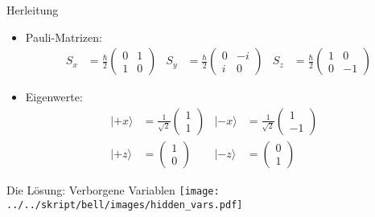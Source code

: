\documentclass{beamer}
\begin{document}
\begin{frame}{Herleitung}
    \begin{itemize}
        \item Pauli-Matrizen:
            \begin{align*}
                S_x &= \frac{\hbar}{2} \begin{pmatrix}
                0 & 1 \\ 1 & 0
                \end{pmatrix}
                &
                S_y &= \frac{\hbar}{2} \begin{pmatrix}
                0 & -i \\ i & 0
                \end{pmatrix}
                &
                S_z &= \frac{\hbar}{2} \begin{pmatrix}
                1 & 0 \\ 0 & -1
                \end{pmatrix}\label{equ:bell:paulimatrizen}
            \end{align*}
        \item Eigenwerte:
            \begin{align*}
                |{+}x\rangle &= \frac{1}{\sqrt{2}}\begin{pmatrix} 1\\1 \end{pmatrix} &
                |{-}x\rangle &= \frac{1}{\sqrt{2}}\begin{pmatrix} 1\\-1 \end{pmatrix} \\
                |{+}z\rangle &= \begin{pmatrix} 1\\0 \end{pmatrix} &
                |{-}z\rangle &= \begin{pmatrix} 0\\1 \end{pmatrix} &
            \end{align*}
    \end{itemize}
\end{frame}
\begin{frame}{Die L\"osung: Verborgene Variablen}
    \centering
    \texttt{[image: ../../skript/bell/images/hidden\_vars.pdf]}
\end{frame}
\end{document}
